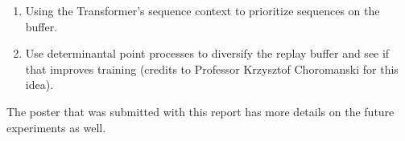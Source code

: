 \documentclass[11pt]{article}
\begin{document}
\begin{enumerate}
    \item Using the Transformer's sequence context to prioritize
sequences on the buffer.
    \item Use determinantal point processes to diversify the replay buffer and see if that improves training (credits to Professor Krzysztof Choromanski for this idea). 
\end{enumerate}

The poster that was submitted with this report has more details on the future experiments as well.

\newpage
 



\end{document}
